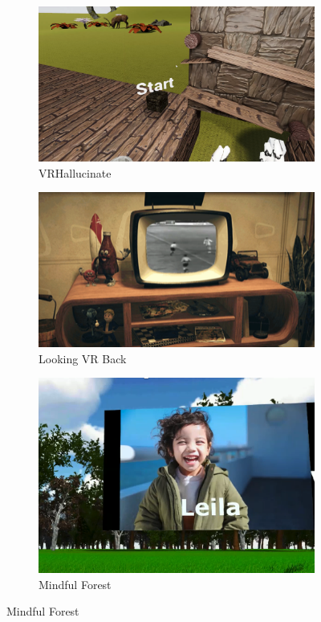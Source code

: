 \begin{figure}[htbp]
\begin{subfigure}[t]{0.3\textwidth}
    \includegraphics[width=\linewidth]{Images/VRHallucinate.png}
\caption{VRHallucinate}
\label{fig:VRHallucinate}
\end{subfigure}\hfill
\begin{subfigure}[t]{0.3\textwidth}
    \includegraphics[width=\linewidth]{Images/LookingVRBack.png}
\caption{Looking VR Back}
\label{fig:LookingVRBack}
\end{subfigure}\hfill
\begin{subfigure}[t]{0.3\textwidth}
    \includegraphics[width=\textwidth]{Images/MindfulForest.png}
\caption{Mindful Forest}
\label{fig:MindfulForest}
\end{subfigure}


\end{figure}
